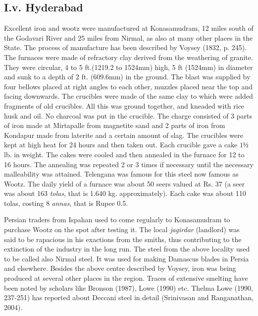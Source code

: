 \vspace{-.3cm}

\subsection*{I.v.  Hyderabad}\label{subsection-5}

\vspace{-.2cm}

Excellent iron and wootz were manufactured at Konasamudram, 12 miles south of the Godavari River and 25 miles from Nirmal, as also at many other places in the State. The process of manufacture has been described by Voysey (1832, p. 245). The furnaces were made of refractory clay derived from the weathering of granite.  They were circular, 4 to 5 ft.(1219.2 to 1524mm) high, 5 ft (1524mm) in diameter and sunk to a depth of 2 ft. (609.6mm) in the ground.  The blast was supplied by four bellows placed at right angles to each other, muzzles placed near the top and facing downwards.  The crucibles were made of the same clay to which were added fragments of old crucibles. All this was ground together, and kneaded with rice husk and oil. No charcoal was put in the crucible.  The charge consisted of 3 parts of iron made at Mirtapalle from magnetite sand and 2 parts of iron from Kondapur made from laterite and a certain amount of slag.  The crucibles were kept at high heat for 24 hours and then taken out.  Each crucible gave a cake $1½$ lb. in weight.  The cakes were cooled and then annealed in the furnace for 12 to 16 hours.  The annealing was repeated 2 or 3 times if necessary until the necessary malleability was attained.  Telengana was famous for this steel now famous as Wootz.  The daily yield of a furnace was about 50 seers valued at Rs. 37 (a seer was about 163 {\it tolas}, that is 1.640 kg. approximately). Each cake was about 110 tolas, costing 8 {\it annas}, that is Rupee 0.5.

Persian traders from Ispahan used to come regularly to Konasamudram to purchase Wootz on the spot after testing it.  The local {\it jagirdar} (landlord) was said to be rapacious in his exactions from the smiths, thus contributing to the extinction of the industry in the long run. The steel from the above locality used to be called also Nirmal steel. It was used for making Damascus blades in Persia and elsewhere. Besides the above centre described by Voysey, iron was being produced at several other places in the region. Traces of extensive smelting have been noted by scholars like Bronson (1987), Lowe (1990) etc. Thelma Lowe (1990, 237-251) has reported about Deccani steel in detail (Srinivasan and Ranganathan, 2004).   


